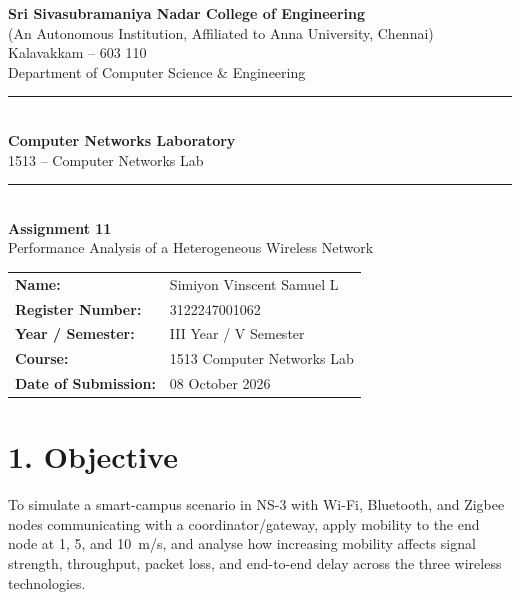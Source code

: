 \documentclass[11pt]{article}
\title{\vspace{-2cm}}
\date{}
\begin{document}
\begin{titlepage}
\centering
\vspace*{1cm}
{\large \textbf{Sri Sivasubramaniya Nadar College of Engineering}}\\
{\small (An Autonomous Institution, Affiliated to Anna University, Chennai)}\\
{\small Kalavakkam -- 603 110}\\[0.3cm]
{\small Department of Computer Science \& Engineering}\\[1.5cm]

\rule{\linewidth}{0.5mm}\\[0.4cm]
{\LARGE \textbf{Computer Networks Laboratory}}\\[0.3cm]
{\Large 1513 -- Computer Networks Lab}\\[0.4cm]
\rule{\linewidth}{0.5mm}\\[1.5cm]

{\huge \textbf{Assignment 11}}\\[0.4cm]
{\Large Performance Analysis of a Heterogeneous Wireless Network}\\[2cm]

\begin{center}
\begin{tabular}{ll}
\textbf{Name:} & Simiyon Vinscent Samuel L \\[0.2cm]
\textbf{Register Number:} & 3122247001062 \\[0.2cm]
\textbf{Year / Semester:} & III Year / V Semester \\[0.2cm]
\textbf{Course:} & 1513 Computer Networks Lab \\[0.2cm]
\textbf{Date of Submission:} & 08 October 2026 \\[0.2cm]
\end{tabular}
\end{center}

\vfill
\end{titlepage}

\section*{1. Objective}
To simulate a smart-campus scenario in NS-3 with Wi-Fi, Bluetooth, and
Zigbee nodes communicating with a coordinator/gateway, apply mobility to the
end node at 1, 5, and 10~m/s, and analyse how increasing mobility affects
signal strength, throughput, packet loss, and end-to-end delay across the
three wireless technologies.
\end{document}
